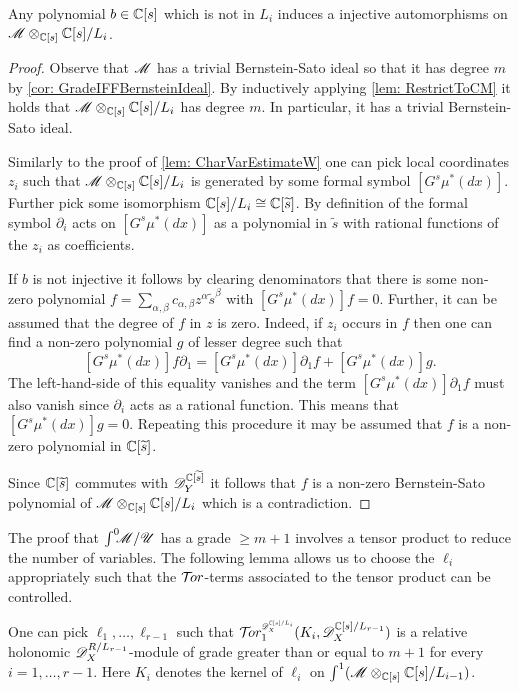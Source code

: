 \begin{lemma}\label{lem: InjectiveEll}
  Any polynomial $b\in \mathbb{C}[s]$ which is not in $L_i$ induces a injective automorphisms on $\mathscr{M} \otimes_{\mathbb{C}[s]}\mathbb{C}[s]/L_i$.
\end{lemma}
\begin{proof}
  Observe that $\mathscr{M}$ has a trivial Bernstein-Sato ideal so that it has degree $m$ by \cref{cor: GradeIFFBernsteinIdeal}.
  By inductively applying \cref{lem: RestrictToCM} it holds that $\mathscr{M} \otimes_{\mathbb{C}[s]}\mathbb{C}[s]/L_i$ has degree $m$.
  In particular, it has a trivial Bernstein-Sato ideal.

  Similarly to the proof of \cref{lem: CharVarEstimateW} one can pick local coordinates $z_i$ such that $\mathscr{M} \otimes_{\mathbb{C}[s]}\mathbb{C}[s]/L_i$ is generated by some formal symbol $[G^s \mu^*(dx)]$.
  Further pick some isomorphism $\mathbb{C}[s]/L_i \cong \mathbb{C}[\widetilde{s}]$.
  By definition of the formal symbol $\partial_i$ acts on $[G^s \mu^*(dx)]$ as a polynomial in $\widetilde{s}$ with rational functions of the $z_i$ as coefficients.

  If $b$ is not injective it follows by clearing denominators that there is some non-zero polynomial $f = \sum_{\alpha,\beta} c_{\alpha,\beta} z^\alpha \widetilde{s}^\beta$ with $[G^s \mu^*(dx)] f = 0$.
  Further, it can be assumed that the degree of $f$ in $z$ is zero.
  Indeed, if $z_i$ occurs in $f$ then one can find a non-zero polynomial $g$ of lesser degree such that
  $$[G^s \mu^*(dx)] f\partial_1 = [G^s \mu^*(dx)]\partial_1 f + [G^s \mu^*(dx)] g.$$
  The left-hand-side of this equality vanishes and the term $[G^s \mu^*(dx)]\partial_1 f$ must also vanish since $\partial_i$ acts as a rational function.
  This means that $[G^s \mu^*(dx)] g = 0$.
  Repeating this procedure it may be assumed that $f$ is a non-zero polynomial in $\mathbb{C}[\widetilde{s}]$.

  Since $\mathbb{C}[\widetilde{s}]$ commutes with $\mathscr{D}_Y^{\mathbb{C}[\widetilde{s}]}$ it follows that $f$ is a non-zero Bernstein-Sato polynomial of $\mathscr{M} \otimes_{\mathbb{C}[s]}\mathbb{C}[s]/L_i$ which is a contradiction.
\end{proof}
The proof that $\int^0 \mkern -8mu\mathscr{M}/\mathscr{U}$ has a grade $\geq m+1$ involves a tensor product to reduce the number of variables.
The following lemma allows us to choose the $\ell_i$ appropriately such that the $\mathcal{T}\mkern -3mu or$-terms associated to the tensor product can be controlled.
\begin{lemma}\label{lem: RelHolTorDegree}
  One can pick $\ell_1,\ldots,\ell_{r-1}$ such that $\Tr{\D_\X^{\C[s]/L_{i}} }{1}(K_i, \D_\X^{\C[s]/L_{r-1}})$ is a relative holonomic $\mathscr{D}_X^{R/L_{r-1}}$-module of grade greater than or equal to $m+1$ for every $i=1,\ldots, r-1$.
  Here $K_i$ denotes the kernel of $\ell_i$ on $\int^1 (\mathscr{M} \otimes_{\mathbb{C}[s]}\mathbb{C}[s]/L_{i-1})$.
\end{lemma}
